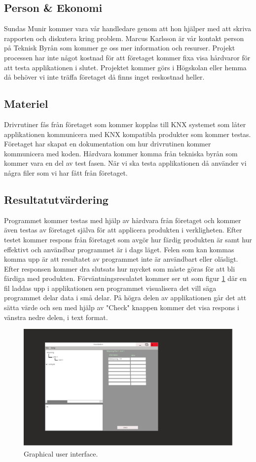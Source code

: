 \documentclass{article}
\begin{document}
\subsection{Person \& Ekonomi}
Sundas Munir kommer vara vår handledare genom att hon hjälper med att skriva rapporten och diskutera kring problem. Marcus Karlsson är vår kontakt person på Teknisk Byrån som kommer ge oss mer information och resurser. Projekt processen har inte något kostnad för att företaget kommer fixa visa hårdvaror för att testa applikationen i slutet. Projektet kommer görs i Högskolan eller hemma då behöver vi inte träffa företaget då finns inget reskostnad heller. \newline
\subsection{Materiel}
Drivrutiner fås från företaget som kommer kopplas till KNX systemet som låter applikationen kommunicera med KNX kompatibla produkter som kommer testas. Företaget har skapat en dokumentation om hur drivrutinen kommer kommunicera med koden. Hårdvara kommer komma från tekniska byrån som kommer vara en del av test fasen. När vi ska testa applikationen då använder vi några filer som vi har fått från företaget.
\subsection{Resultatutvärdering}
Programmet kommer testas med hjälp av hårdvara från företaget 
och kommer även testas av företaget själva för att applicera produkten i verkligheten. Efter testet kommer respons från företaget som avgör hur färdig produkten är samt hur effektivt och användbar programmet är i dags läget. Felen som kan kommas komma upp är att resultatet av programmet inte är användbart eller oläsligt. Efter responsen kommer dra slutsats hur mycket som måste göras för att bli färdiga med produkten.
Förväntningsresulatet kommer ser ut som figur \ref{fig:GUI} där en fil laddas upp i applikationen sen programmet visualisera det vill säga programmet delar data i små delar. På högra delen av applikationen går det att sätta värde och sen med hjälp av "Check" knappen kommer det visa respons i vänstra nedre delen, i text format.\newline
\begin{figure}
    \includegraphics[width=\linewidth]{../SourceFiles/Visualization.jpg}
    \caption{Graphical user interface.}
    \label{fig:GUI}
\end{figure}
\end{document}
